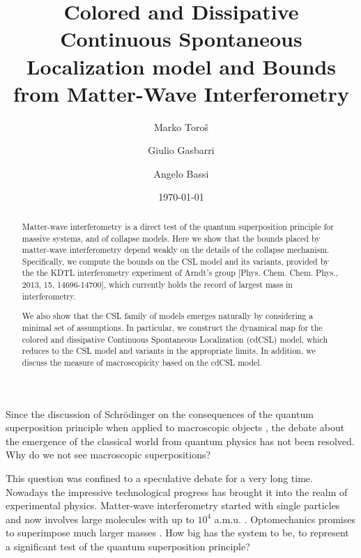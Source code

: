 \documentclass[prl,twocolumn,showpacs,superscriptaddress,groupedaddress]{revtex4}
\begin{document}
\author{Marko Toro\v{s}}

\author{Giulio Gasbarri}

\author{Angelo Bassi}

\title{Colored and Dissipative Continuous Spontaneous Localization model
and Bounds from Matter-Wave Interferometry}
\date{\today}
\begin{abstract}
Matter-wave interferometry is a direct test of the quantum superposition principle for massive systems, and of collapse models. 
Here we show that the bounds placed by matter-wave interferometry depend weakly on the details of the collapse mechanism. Specifically, we compute the bounds on the CSL model and its variants, provided by the the KDTL interferometry experiment of Arndt's group [Phys. Chem. Chem. Phys., 2013, 15, 14696-14700], which currently holds the record of largest mass in interferometry. 

 We also show that the CSL family of models emerges naturally by considering a minimal set of assumptions. In particular, we construct the dynamical map for the colored and dissipative Continuous Spontaneous Localization (cdCSL) model, which reduces to the CSL model and variants in the appropriate limits. In addition, we discuss the measure of macroscopicity based on the cdCSL model.
\end{abstract}
\maketitle

Since the discussion of Schr\"odinger on the consequences of  the quantum superposition principle when applied to macroscopic objects \cite{Schrodinger},  the debate about the emergence of the classical world from quantum physics has not been resolved. Why do we not see macroscopic superpositions?

This question was confined to a speculative debate for a very long time. Nowadays the impressive technological progress has brought it into  the realm of experimental physics. Matter-wave interferometry started with single particles \cite{Jonsson} and now involves large molecules with up to $10^4$ a.m.u. \cite{C3CP51500A}. Optomechanics promises to superimpose much larger masses \cite{PhysRevLett.107.020405}. How big has the system to be, to represent a significant test of the quantum superposition principle?
\end{document}
